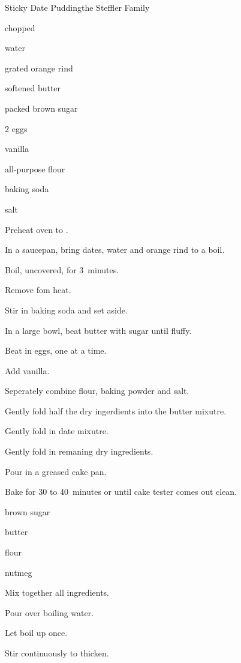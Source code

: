 \begin{recipe}{Sticky Date Pudding}{the Steffler Family}{}

\begin{ingredients}
\item \C{1\threequarter} chopped 
\item {} water
\item {} grated orange rind
\item \C{\half} softened butter
\item \C{\third} packed brown sugar
\item 2 eggs
\item {} vanilla
\item \C{1\quarter} all-purpose flour
\item {} baking soda
\item \tp{\half} salt
\end{ingredients}

\begin{directions}
\item Preheat oven to .
\item In a saucepan, bring dates, water and orange rind to a boil.
\item Boil, uncovered, for 3~minutes.
\item Remove fom heat.
\item Stir in baking soda and set aside.
\item In a large bowl, beat butter with sugar until fluffy.
\item Beat in eggs, one at a time.
\item Add vanilla.
\item Seperately combine flour, baking powder and salt.
\item Gently fold half the dry ingerdients into the butter mixutre.
\item Gently fold in date mixutre.
\item Gently fold in remaning dry ingredients.
\item Pour in a greased cake pan.
\item Bake for 30 to 40~minutes or until cake tester comes out clean.
\end{directions}


\begin{ingredients}
\item {} brown sugar
\item {} butter
\item {} flour
\item nutmeg
\end{ingredients}

\begin{directions}
\item Mix together all ingredients.
\item Pour over  boiling water.
\item Let boil up once.
\item Stir continuously to thicken.
\end{directions}
\end{recipe}
